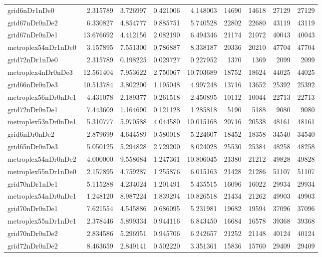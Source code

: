 \begin{longtable}{|l|r|r|r|r|r|r|r|r|}
grid6nDr1nDe0 & 2.315789 & 3.726997 & 0.421006 & 4.148003 & 14690 & 14618 & 27129 & 27129 \\
grid67nDr0nDe2 & 6.330827 & 4.854777 & 0.885751 & 5.740528 & 22802 & 22680 & 43119 & 43119 \\
grid67nDr0nDe1 & 13.676692 & 4.412156 & 2.082190 & 6.494346 & 21174 & 21072 & 40043 & 40043 \\
metroplex54nDr1nDe0 & 3.157895 & 7.551300 & 0.786887 & 8.338187 & 20336 & 20210 & 47704 & 47704 \\
grid72nDr1nDe0 & 2.315789 & 0.198225 & 0.029727 & 0.227952 & 1370 & 1369 & 2099 & 2099 \\
metroplex4nDr0nDe3 & 12.561404 & 7.953622 & 2.750067 & 10.703689 & 18752 & 18624 & 44025 & 44025 \\
grid66nDr0nDe3 & 10.513784 & 3.802200 & 1.195048 & 4.997248 & 13716 & 13652 & 25392 & 25392 \\
metroplex56nDr0nDe1 & 4.431078 & 2.189377 & 0.261518 & 2.450895 & 10112 & 10044 & 22713 & 22713 \\
grid72nDr0nDe1 & 7.443609 & 1.164690 & 0.121128 & 1.285818 & 5190 & 5188 & 9080 & 9080 \\
metroplex53nDr0nDe1 & 5.310777 & 5.970588 & 4.044580 & 10.015168 & 20716 & 20538 & 48161 & 48161 \\
grid6nDr0nDe2 & 2.879699 & 4.644589 & 0.580018 & 5.224607 & 18452 & 18358 & 34540 & 34540 \\
grid65nDr0nDe3 & 5.050125 & 5.294828 & 2.729200 & 8.024028 & 25530 & 25384 & 48258 & 48258 \\
metroplex54nDr0nDe2 & 4.000000 & 9.558684 & 1.247361 & 10.806045 & 21380 & 21212 & 49828 & 49828 \\
metroplex55nDr1nDe0 & 2.157895 & 4.759287 & 1.255876 & 6.015163 & 21428 & 21286 & 51107 & 51107 \\
grid70nDr1nDe1 & 5.115288 & 4.234024 & 1.201491 & 5.435515 & 16096 & 16022 & 29934 & 29934 \\
metroplex54nDr0nDe1 & 1.248120 & 8.987224 & 1.839294 & 10.826518 & 21434 & 21262 & 49903 & 49903 \\
grid70nDr0nDe1 & 7.621554 & 4.545886 & 0.686095 & 5.231981 & 19682 & 19594 & 37096 & 37096 \\
metroplex55nDr1nDe1 & 2.378446 & 5.899334 & 0.944116 & 6.843450 & 16684 & 16578 & 39368 & 39368 \\
grid70nDr0nDe2 & 2.834586 & 5.296951 & 0.945706 & 6.242657 & 21252 & 21148 & 40124 & 40124 \\
grid72nDr0nDe2 & 8.463659 & 2.849141 & 0.502220 & 3.351361 & 15836 & 15760 & 29409 & 29409 \\

\end{longtable}
